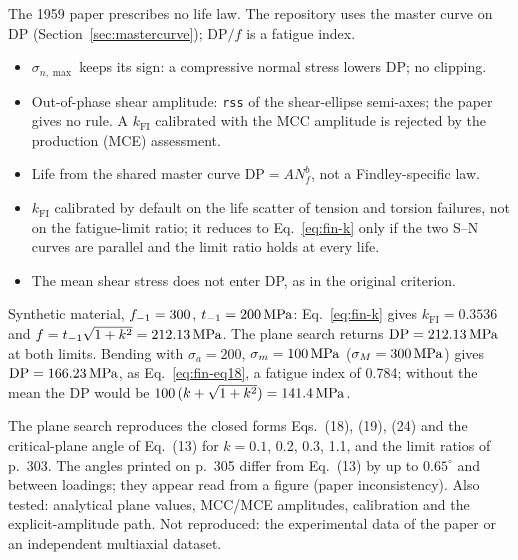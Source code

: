  The 1959 paper prescribes no life law. The repository uses the master curve on DP
(Section~\ref{sec:mastercurve}); $\mathrm{DP}/f$ is a fatigue index.

\begin{itemize}
\item $\sigma_{n,\max}$ keeps its sign: a compressive normal stress lowers DP; no clipping.
\item Out-of-phase shear amplitude: \texttt{rss} of the shear-ellipse semi-axes; the paper gives no
  rule. A $k_\mathrm{FI}$ calibrated with the MCC amplitude is rejected by the production (MCE)
  assessment.
\item Life from the shared master curve $\mathrm{DP}=AN_f^b$, not a Findley-specific law.
\item $k_\mathrm{FI}$ calibrated by default on the life scatter of tension and torsion failures, not
  on the fatigue-limit ratio; it reduces to Eq.~\eqref{eq:fin-k} only if the two S--N curves are
  parallel and the limit ratio holds at every life.
\item The mean shear stress does not enter DP, as in the original criterion.
\end{itemize}

 Synthetic material, $f_{-1}=300$, $t_{-1}=200\,\mathrm{MPa}$: Eq.~\eqref{eq:fin-k} gives
$k_\mathrm{FI}=0.3536$ and $f=t_{-1}\sqrt{1+k^2}=212.13\,\mathrm{MPa}$. The plane search returns
$\mathrm{DP}=212.13\,\mathrm{MPa}$ at both limits. Bending with $\sigma_a=200$, $\sigma_m=100\,\mathrm{MPa}$
($\sigma_M=300\,\mathrm{MPa}$) gives $\mathrm{DP}=166.23\,\mathrm{MPa}$, as Eq.~\eqref{eq:fin-eq18}, a fatigue index
of 0.784; without the mean the DP would be $100\,(k+\sqrt{1+k^2})=141.4\,\mathrm{MPa}$.

 The plane search reproduces the closed forms Eqs.~(18), (19), (24) and the
critical-plane angle of Eq.~(13) for $k=0.1$, 0.2, 0.3, 1.1, and the limit ratios of p.~303. The
angles printed on p.~305 differ from Eq.~(13) by up to $0.65^\circ$ and between loadings; they appear
read from a figure (paper inconsistency). Also tested: analytical plane values, MCC/MCE amplitudes,
calibration and the explicit-amplitude path. Not reproduced: the experimental data of the paper or
an independent multiaxial dataset.
